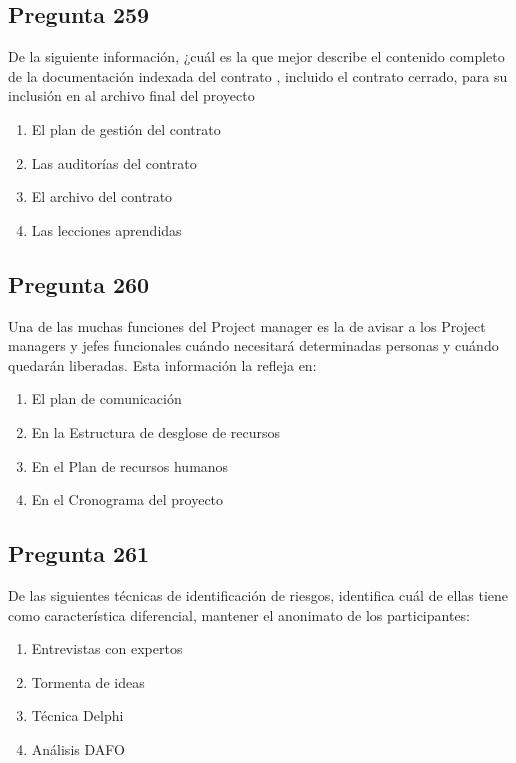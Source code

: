 \documentclass[11pt,a4paper]{article}
\begin{document}
\subsection*{Pregunta 259}
De la siguiente información, ¿cuál es la que mejor describe el contenido completo de la documentación indexada del contrato , incluido el contrato cerrado, para su inclusión en al archivo final del proyecto

\begin{enumerate}[label=\alph*)]
  \item El plan de gestión del contrato
  \item Las auditorías del contrato
  \item El archivo del contrato
  \item Las lecciones aprendidas
\end{enumerate}

\subsection*{Pregunta 260}
Una de las muchas funciones del Project manager es la de avisar a los Project managers y jefes funcionales cuándo necesitará determinadas personas y cuándo quedarán liberadas. Esta información la refleja en:

\begin{enumerate}[label=\alph*)]
  \item El plan de comunicación
  \item En la Estructura de desglose de recursos
  \item En el Plan de recursos humanos
  \item En el Cronograma del proyecto
\end{enumerate}

\subsection*{Pregunta 261}
De las siguientes técnicas de identificación de riesgos, identifica cuál de ellas tiene como característica diferencial, mantener el anonimato de los participantes:

\begin{enumerate}[label=\alph*)]
  \item Entrevistas con expertos
  \item Tormenta de ideas
  \item Técnica Delphi
  \item Análisis DAFO
\end{enumerate}
\end{document}
